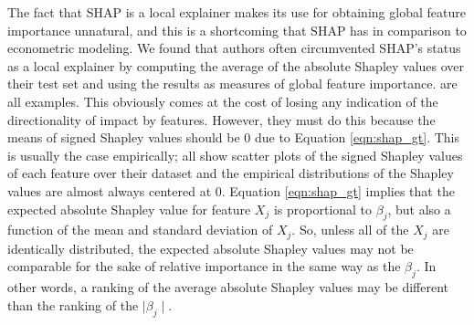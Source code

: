 \documentclass[12pt]{article}  %
\begin{document}
     The fact that SHAP is a local explainer makes its use for obtaining global feature importance unnatural, and this is a shortcoming that SHAP has in comparison to econometric modeling. We found that authors often circumvented SHAP's status as a local explainer by computing the average of the absolute Shapley values over their test set and using the results as measures of global feature importance. \cite{lenaers23rent,maeng23vr,guenther2023useful} are all examples. This obviously comes at the cost of losing any indication of the directionality of impact by features. However, they must do this because the means of signed Shapley values should be 0 due to Equation \ref{eqn:shap_gt}. This is usually the case empirically; \cite{lenaers23rent,maeng23vr,jiang24churn} all show scatter plots of the signed Shapley values of each feature over their dataset and the empirical distributions of the Shapley values are almost always centered at 0. Equation \ref{eqn:shap_gt} implies that the expected absolute Shapley value for feature $X_j$ is proportional to $\beta_j$, but also a function of the mean and standard deviation of $X_j$. So, unless all of the $X_j$ are identically distributed, the expected absolute Shapley values may not be comparable for the sake of relative importance in the same way as the $\beta_j$. In other words, a ranking of the average absolute Shapley values may be different than the ranking of the $\mid \beta_j\mid$.  %
\end{document}
